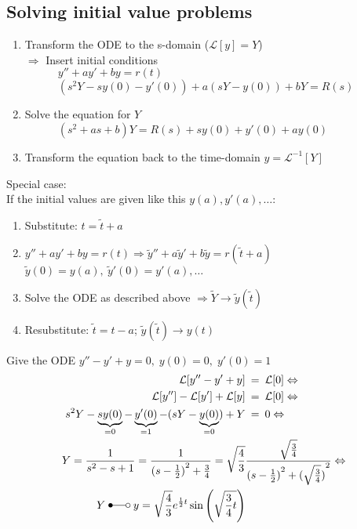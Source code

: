 \subsection{Solving initial value problems}
\begin{enumerate}
    \item Transform the ODE to the s-domain ($\mathcal{L}[y]=Y$)\\
          $\Rightarrow$ Insert initial conditions\\
          $\quad\qquad y''+ay'+by=r(t)$\\
          $\quad\qquad(s^2Y-sy(0)-y'(0))+a(sY-y(0))+bY=R(s)$
    \item Solve the equation for $Y$ \\
          $\quad\qquad (s^2+as+b)Y=R(s)+sy(0)+y'(0)+ay(0)$
    \item Transform the equation back to the time-domain $y=\mathcal{L}^{-1}[Y]$
\end{enumerate}
Special case:\\
If the initial values are given like this $y(a),y'(a),\dots$:
\begin{enumerate}[label=\alph*]
    \item Substitute: $t=\tilde{t}+a$
    \item $y''+ay'+by=r(t) \Rightarrow \tilde{y}''+a\tilde{y}'+b\tilde{y}=r(\tilde{t}+a)$\\
          $\tilde{y}(0)=y(a),\:\tilde{y}'(0)=y'(a),\dots$
    \item Solve the ODE as described above $\Rightarrow \tilde{Y} \rightarrow \tilde{y}(\tilde{t})$
    \item Resubstitute: $\tilde{t}=t-a$; $\tilde{y}(\tilde{t})\rightarrow y(t)$
\end{enumerate}

\begin{examplesection}[Example]
    Give the ODE $y''-y'+y=0,\;y(0)=0,\;y'(0)=1$
    \begin{align*}
        \mathcal{L}[y''-y'+y]                                                               & \:=\:\mathcal{L}[0] \Leftrightarrow                                                     \\
        \mathcal{L}[y'']-\mathcal{L}[y']+\mathcal{L}[y]                                     & \:=\:\mathcal{L}[0] \Leftrightarrow                                                     \\
        s^2Y -\underbrace{sy(0)}_{=0}-\underbrace{y'(0)}_{=1}-(sY-\underbrace{y(0)}_{=0})+Y & \:=\:0 \Leftrightarrow                                                                  \\
        Y=\frac{1}{s^2-s+1}=\frac{1}{{(s-\frac{1}{2})}^2+\frac{3}{4}}=\sqrt{\frac{4}{3}}    & \frac{\sqrt{\frac{3}{4}}}{{(s-\frac{1}{2})}^2+{(\sqrt{\frac{3}{4}})}^2} \Leftrightarrow \\
        Y\;\Laplace\;y=\sqrt{\frac{4}{3}}e^{\frac{1}{2}t}\sin\left(\sqrt{\frac{3}{4}t}\right)
    \end{align*}
\end{examplesection}

